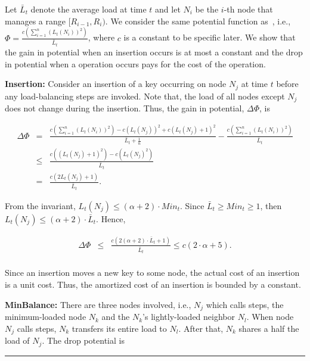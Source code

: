 \documentclass[a4paper]{article}
\newenvironment{proof}{{\bf Proof:}}{\hfill\rule{1.5mm}{3mm}\vspace{0.1in}}
\begin{document}
\begin{proof}
  Let $\bar{L}_t$ denote the average load at time $t$ and let $N_i$ be
  the $i$-th node that manages a range $[R_{i-1}, R_i)$. We consider the
  same potential function as~\cite{GanesanBGM04-vldb}, i.e., $\Phi =
  \frac{c\left(\sum^{n}_{i=1}(L_t(N_i))^2\right)}{\bar{L}_t}$, where $c$ is a
  constant to be specific later. We show that the gain in potential
  when an insertion occurs is at most a constant and the drop in
  potential when a {\minbalance} operation occurs pays for the cost
  of the operation.

  \textbf{Insertion:} Consider an insertion of a key occurring on node
  $N_j$ at time $t$ before any load-balancing steps are invoked. Note
  that, the load of all nodes except $N_j$ does not change during the
  insertion. Thus, the gain in potential, $\Delta\Phi$, is

  \begin{eqnarray*}
    \Delta\Phi
    &=&\frac{c\left(\sum^{n}_{i=1}(L_t(N_i))^2\right)-c\left(L_t(N_j)\right)^2+c\left(L_t(N_j)+1\right)^2}{\bar{L}_{t}+\frac{1}{n}}-\frac{c\left(\sum^{n}_{i=1}(L_t(N_i))^2\right)}{\bar{L}_{t}}\\
    &\leq&\frac{c\left((L_{t}(N_j)+1)^2\right)-c\left(L_t(N_j)^2\right)}{\bar{L}_{t}}\\
    &=& \frac{c\left(2L_{t}(N_j)+1\right)}{\bar{L}_t}.
  \end{eqnarray*}	

  From the invariant,  $L_{t}(N_j)\leq (\alpha+2)\cdot Min_t$. Since 
  $\bar{L}_t\geq Min_t\geq 1$, then
  $L_{t}(N_j) \leq (\alpha+2)\cdot \bar{L}_t$. Hence, 
  
  \begin{eqnarray*}
    \Delta\Phi &\leq&
    \frac{c\left(2(\alpha+2)\cdot \bar{L}_t+1\right)}{\bar{L}_t}
    \leq c\left(2\cdot \alpha+5\right).\\
  \end{eqnarray*}	

  Since an insertion moves a new key to some node, the actual cost of an
  insertion is a unit cost. Thus, the amortized cost of an insertion is
  bounded by a constant.

  \textbf{MinBalance:} There are three nodes involved, i.e.,
  $N_j$ which calls {\minbalance} steps, the minimum-loaded node $N_k$
  and the $N_k$'s lightly-loaded neighbor $N_l$. When node $N_j$ calls
  {\minbalance} steps, $N_k$ transfers its entire load to $N_l$. After
  that, $N_k$ shares a half the load of $N_j$.  The drop potential is


\end{proof}
\end{document}
